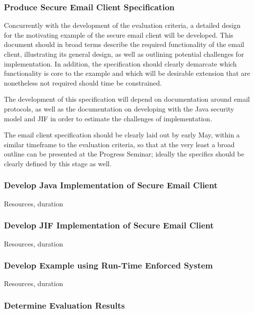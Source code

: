 \subsubsection{Produce Secure Email Client Specification}

Concurrently with the development of the evaluation criteria, a detailed design for the motivating example of the secure email client will be developed. This document should in broad terms describe the required functionality of the email client, illustrating its general design, as well as outlining potential challenges for implementation. In addition, the specification should clearly demarcate which functionality is core to the example and which will be desirable extension that are nonetheless not required should time be constrained.

The development of this specification will depend on documentation around email protocols, as well as the documentation on developing with the Java security model and JIF in order to estimate the challenges of implementation.

The email client specification should be clearly laid out by early May, within a similar timeframe to the evaluation criteria, so that at the very least a broad outline can be presented at the Progress Seminar; ideally the specifics should be clearly defined by this stage as well.

\subsubsection{Develop Java Implementation of Secure Email Client}



Resources, duration

\subsubsection{Develop JIF Implementation of Secure Email Client}

Resources, duration

\subsubsection{Develop Example using Run-Time Enforced System}

Resources, duration

\subsubsection{Determine Evaluation Results}

